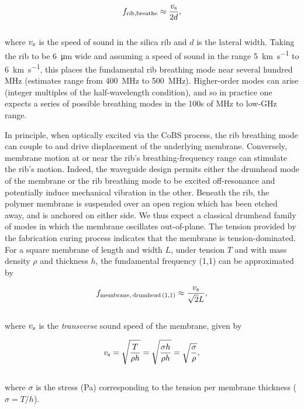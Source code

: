 \begin{equation}
f_{\rm rib,breathe} \approx \frac{v_{\rm s}}{2d},
\end{equation}
\\
where \(v_{\rm s}\) is the speed of sound in the silica rib and \(d\) is the lateral width. Taking the rib to be \SI{6}{\micro\meter} wide and assuming a speed of sound in the range \SI{5}{\kilo\meter\per\second} to \SI{6}{\kilo\meter\per\second}, this places the fundamental rib breathing mode near several hundred \si{\mega\hertz} (estimates range from \SI{400}{\mega\hertz} to \SI{500}{\mega\hertz}). Higher-order modes can arise (integer multiples of the half-wavelength condition), and so in practice one expects a series of possible breathing modes in the 100s of \si{\mega\hertz} to low-\si{\giga\hertz} range.

In principle, when optically excited via the \ac{CoBS} process, the rib breathing mode can couple to and drive displacement of the underlying membrane. Conversely, membrane motion at or near the rib’s breathing-frequency range can stimulate the rib's motion. Indeed, the waveguide design permits either the drumhead mode of the membrane or the rib breathing mode to be excited off-resonance and potentially induce mechanical vibration in the other. Beneath the rib, the polymer membrane is suspended over an open region which has been etched away, and is anchored on either side. We thus expect a classical drumhead family of modes in which the membrane oscillates out-of-plane. The tension provided by the fabrication curing process indicates that the membrane is tension-dominated. For a square membrane of length and width \(L\), under tension \(T\) and with mass density \(\rho\) and thickness \(h\), the fundamental frequency (1,1) can be approximated by

\begin{equation}
  f_{\rm membrane,\,drumhead\,(1,1)} \approx \frac{v_{\rm s}}{\sqrt{2}L},
  \label{eq:Raman:SquareMembrane}
\end{equation}
\\
where \(v_{\rm s}\) is the \emph{transverse} sound speed of the membrane, given by

\begin{equation}
  v_{\rm s} = \sqrt{\frac{T}{\rho h}} = \sqrt{\frac{\sigma h}{\rho h}} = \sqrt{\frac{\sigma}{\rho}},
  \label{eq:Raman:TransverseSoundSpeed}
\end{equation}
\\
where \(\sigma\) is the stress (\si{\pascal}) corresponding to the tension per membrane thickness (\(\sigma = T/h\)).

